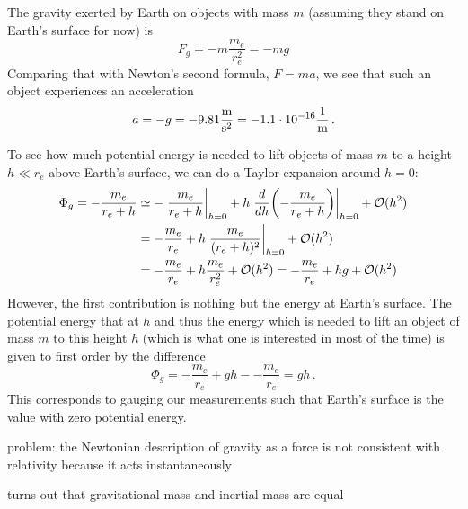 \begin{ex}
The gravity exerted by Earth on objects with mass $m$ (assuming they stand on Earth's surface for now) is
\begin{equation}
F_g = - m \frac{m_e}{r_e^2} = - m g
\end{equation}
Comparing that with Newton's second formula, $F = m a$, we see that such an object experiences an acceleration
\begin{equation}
a = - g = - 9.81 \frac{\metre}{\second^2} = - 1.1 \cdot 10^{-16} \frac{1}{\metre} \, .
\end{equation}

To see how much potential energy is needed to lift objects of mass $m$ to a height $h \ll r_e$ above Earth's surface, we can do a Taylor expansion around $h = 0$:
\begin{align*}
\Phi_g = - \frac{m_e}{r_e + h} &\simeq - \eval{\frac{m_e}{r_e + h}}_{h = 0} + h \eval{\dv{h}\qty(- \frac{m_e}{r_e + h})}_{h = 0} + \mathcal{O}(h^2)
\\
&= - \frac{m_e}{r_e} + h \eval{\frac{m_e}{(r_e + h)^2}}_{h = 0} + \mathcal{O}(h^2)
\\
&= - \frac{m_e}{r_e} + h \frac{m_e}{r_e^2} + \mathcal{O}(h^2) = - \frac{m_e}{r_e} + h g + \mathcal{O}(h^2)
\end{align*}
However, the first contribution is nothing but the energy at Earth's surface. The potential energy that at $h$ and thus the energy which is needed to lift an object of mass $m$ to this height $h$ (which is what one is interested in most of the time) is given to first order by the difference
\begin{equation}
\Phi_g =  - \frac{m_e}{r_e} + g h - - \frac{m_e}{r_e} = g h \, .
\end{equation}
This corresponds to gauging our measurements such that Earth's surface is the value with zero potential energy.
\end{ex}


problem: the Newtonian description of gravity as a force is not consistent with relativity because it acts instantaneously



turns out that gravitational mass and inertial mass are equal


